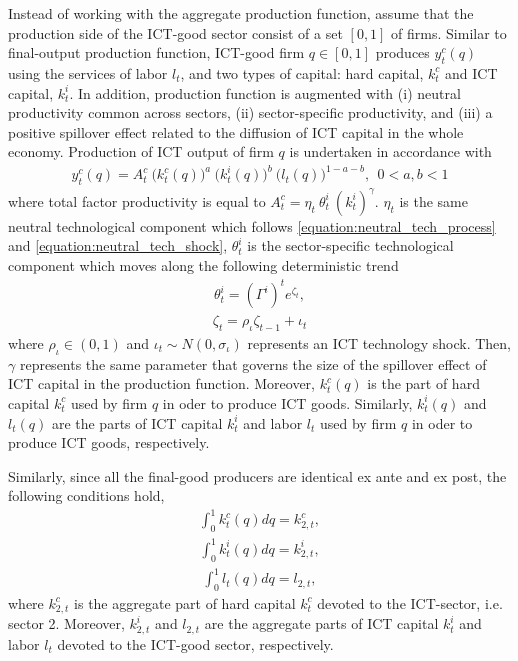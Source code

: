 \documentclass[12pt]{article}
\begin{document}
Instead of working with the aggregate production function, assume that the production side of the ICT-good sector consist of a set $[0,1]$ of firms. Similar to final-output production function, ICT-good firm $q \in [0,1]$ produces $y^c_t(q)$ using the services of labor $l_{t}$, and two types of capital: hard capital, $k^c_{t}$ and ICT capital, $k^i_{t}$. In addition, production function is augmented with (i) neutral productivity common across sectors, (ii) sector-specific productivity, and (iii) a positive spillover effect related to the diffusion of ICT capital in the whole economy. Production of ICT output of firm $q$ is undertaken in accordance with
\begin{eqnarray}\label{equation:productionICT}
y^c_t(q) = A^c_t \ \big( k^c_{t}(q) \big)^a \ \big( k^i_{t}(q) \big)^b \ \big( l_{t}(q) \big)^{1-a-b}, \ \ 0 < a,b < 1
\end{eqnarray}
where total factor productivity is equal to $ A_t^c = \eta_t \ \theta^i_t \ (k^i_{t})^{\gamma} $. $\eta_t$ is the same neutral technological component which follows \ref{equation:neutral_tech_process} and \ref{equation:neutral_tech_shock}, $\theta^i_t$ is the sector-specific technological component which moves along the following deterministic trend
\begin{eqnarray}\label{equation:ICT_tech_process}
\theta^i_t = (\Gamma^{i})^t e^{\zeta_t},  
\end{eqnarray} 
\begin{eqnarray}\label{equation:ICT_tech_shock}
\zeta_t = \rho_{\iota} \zeta_{t-1} + \iota_t
\end{eqnarray} 
where $\rho_{\iota} \in (0,1)$ and $\iota_t \sim N(0,\sigma_{\iota})$ represents an ICT technology shock.
Then, $\gamma$ represents the same parameter that governs the size of the spillover effect of ICT capital in the production function. Moreover, $k^c_{t}(q)$ is the part of hard capital $k^c_t$ used by firm $q$ in oder to produce ICT goods. Similarly, $k^i_{t}(q)$ and $l_{t}(q)$ are the parts of ICT capital $k^i_t$ and labor $l_t$ used by firm $q$ in oder to produce ICT goods, respectively. 

Similarly, since all the final-good producers are identical ex ante and ex post, the following conditions hold,
\begin{eqnarray}\label{equation:aggregation_hard_ICTsec}
\int_0^1 k^c_{t}(q) dq = k^c_{2,t},
\end{eqnarray}
\begin{eqnarray}\label{equation:aggregation_ICT_ICTsec}
\int_0^1 k^i_{t}(q) dq = k^i_{2,t}, 
\end{eqnarray}
\begin{eqnarray}\label{equation:aggregation_labor_ICTsec}
\int_0^1 l_{t}(q) dq = l_{2,t},
\end{eqnarray}
where $k^c_{2,t}$ is the aggregate part of hard capital $k^c_t$ devoted to the ICT-sector, i.e. sector 2. Moreover, $k^i_{2,t}$ and $l_{2,t}$ are the aggregate parts of ICT capital $k^i_{t}$ and labor $l_{t}$ devoted to the ICT-good sector, respectively. 
\end{document}
